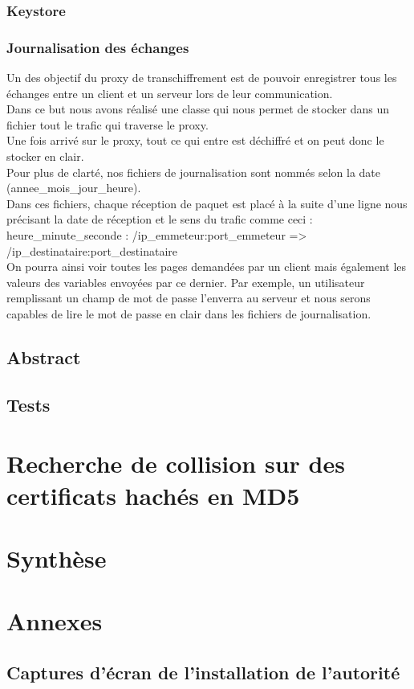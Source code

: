 \documentclass[a4paper,11pt,french]{report}
\begin{document}
\subsection{Keystore}


\subsection{Journalisation des échanges}
Un des objectif du proxy de transchiffrement est de pouvoir enregistrer tous les 
échanges entre un client et un serveur lors de leur communication.~~\\
Dans ce but nous avons réalisé une classe qui nous permet de stocker dans un fichier tout le trafic qui traverse le proxy.~~\\

Une fois arrivé sur le proxy, tout ce qui entre est déchiffré et on peut donc le stocker en clair.~~\\

Pour plus de clarté, nos fichiers de journalisation sont nommés selon la date (annee\_mois\_jour\_heure).~~\\

Dans ces fichiers, chaque réception de paquet est placé à la suite d'une ligne nous précisant la date de réception et le sens du trafic comme ceci : ~~\\

heure\_minute\_seconde : /ip\_emmeteur:port\_emmeteur => /ip\_destinataire:port\_destinataire~~\\

On pourra ainsi voir toutes les pages demandées par un client mais également les valeurs des variables envoyées par ce dernier. Par exemple, un utilisateur remplissant un champ de mot de passe l'enverra au serveur et nous serons capables de lire le mot de passe en clair dans les fichiers de journalisation.
\section{Abstract}


\section{Tests}

\chapter{Recherche de collision sur des certificats hachés en MD5}

\chapter{Synthèse}

\chapter{Annexes}

\section{Captures d'écran de l'installation de l'autorité}
\end{document}

